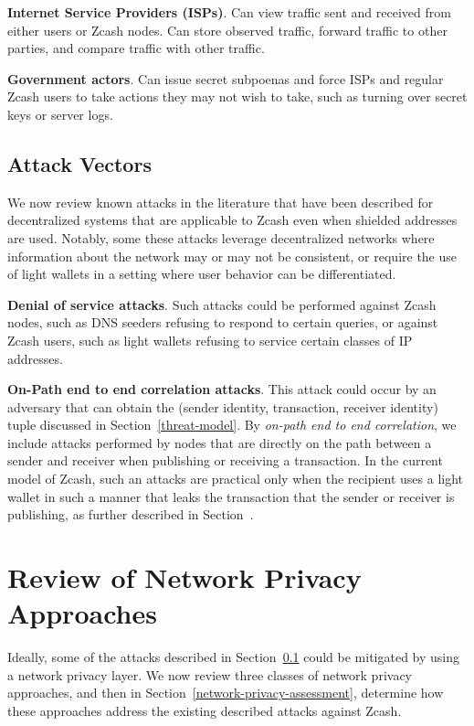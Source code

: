\documentclass{article}
\begin{document}
\textbf{Internet Service Providers (ISPs)}. Can view traffic sent and received
from either users or Zcash nodes. Can store observed traffic, forward traffic
to other parties, and compare traffic with other traffic.

\textbf{Government actors}. Can issue secret subpoenas and force ISPs and
regular Zcash users to take actions they may not wish to take, such as turning
over secret keys or server logs.

\subsection{Attack Vectors}
\label{attack-vectors}

We now review known attacks in the literature that have been described for
decentralized systems that are applicable to Zcash even when shielded addresses
are used. Notably, some these attacks leverage
decentralized networks where information about the network may or may not be
consistent, or require the use of light wallets in a setting where user
behavior can be differentiated.

\textbf{Denial of service attacks}. Such attacks could be performed against
Zcash nodes, such as DNS seeders refusing to respond to certain queries, or
against Zcash users, such as light wallets refusing to service certain classes
of IP addresses.

\textbf{On-Path end to end correlation attacks}. This attack could occur by an
adversary that can obtain the (sender identity, transaction, receiver identity)
tuple discussed in Section~\ref{threat-model}. By \emph{on-path end to end
correlation}, we include attacks performed by nodes that are directly on the
path between a sender and receiver when publishing or receiving a transaction.
In the current model of Zcash, such an attacks are practical
only when the recipient uses a light wallet in such a manner that leaks the
transaction that the sender or receiver is publishing, as further described in
Section~\cite{light-wallet-spec}.


\section{Review of Network Privacy Approaches}
\label{network-privacy-review}

Ideally, some of the attacks described in Section~\ref{attack-vectors} could be
mitigated by using a network privacy layer. We now review three
classes of network privacy approaches, and then in
Section~\ref{network-privacy-assessment}, determine how these approaches
address the existing described attacks against Zcash.
\end{document}
